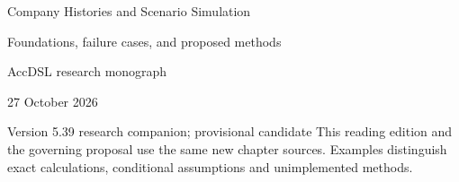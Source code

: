 \documentclass[11pt,a4paper]{report}
\begin{document}
\hypersetup{pageanchor=false}
\begin{titlepage}
{\Huge Company Histories and Scenario Simulation\par}
\vspace{12mm}
{\Large Foundations, failure cases, and proposed methods\par}
\vspace{8mm}
AccDSL research monograph\par 27 October 2026\par Version 5.39 research companion; provisional candidate
\vfill
This reading edition and the governing proposal use the same new chapter sources. Examples distinguish exact calculations, conditional assumptions and unimplemented methods.
\end{titlepage}
\hypersetup{pageanchor=true}
\tableofcontents
\clearpage{}


























\clearpage\label{sim:body-end}

\begingroup\raggedright
\endgroup
\end{document}
